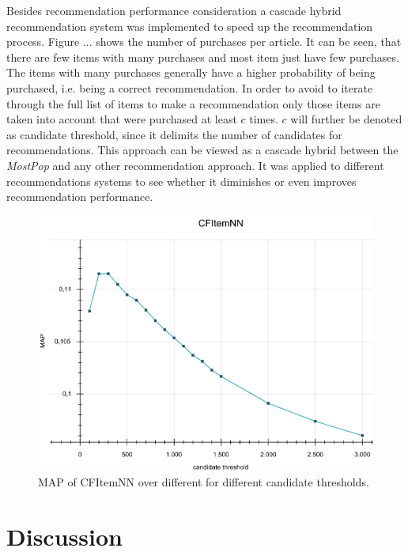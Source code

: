 \documentclass[10pt]{reportMaster}
\begin{document}
Besides recommendation performance consideration a cascade hybrid recommendation system was implemented to speed up the recommendation process.
Figure ... shows the number of purchases per article. %
It can be seen, that there are few items with many purchases and most item just have few purchases.
The items with many purchases generally have a higher probability of being purchased, i.e. being a correct recommendation.
In order to avoid to iterate through the full list of items to make a recommendation only those items are taken into account that were purchased at least $c$ times.
$c$ will further be denoted as candidate threshold, since it delimits the number of candidates for recommendations.
This approach can be viewed as a cascade hybrid between the \textit{MostPop} and any other recommendation approach.
It was applied to different recommendations systems to see whether it diminishes or even improves recommendation performance.

\begin{figure}
	\label{fig:CFItemNNCandidates}
	\caption{MAP of CFItemNN over different for different candidate thresholds. }
	\centering
	\includegraphics[width=1\textwidth]{figures/experiments/CFItemNNCandidates}
\end{figure}





\section{Discussion}
\label{sec:discussion}
\end{document}
